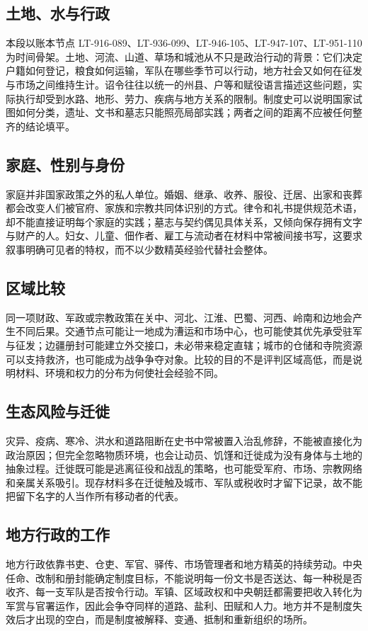 \subsection{土地、水与行政}
本段以账本节点 LT-916-089、LT-936-099、LT-946-105、LT-947-107、LT-951-110 为时间骨架。土地、河流、山道、草场和城池从不只是政治行动的背景：它们决定户籍如何登记，粮食如何运输，军队在哪些季节可以行动，地方社会又如何在征发与市场之间维持生计。诏令往往以统一的州县、户等和赋役语言描述这些问题，实际执行却受到水路、地形、劳力、疾病与地方关系的限制。制度史可以说明国家试图如何分类，遗址、文书和墓志只能照亮局部实践；两者之间的距离不应被任何整齐的结论填平。

\subsection{家庭、性别与身份}
家庭并非国家政策之外的私人单位。婚姻、继承、收养、服役、迁居、出家和丧葬都会改变人们被官府、家族和宗教共同体识别的方式。律令和礼书提供规范术语，却不能直接证明每个家庭的实践；墓志与契约偶见具体关系，又倾向保存拥有文字与财产的人。妇女、儿童、佃作者、雇工与流动者在材料中常被间接书写，这要求叙事明确可见者的特权，而不以少数精英经验代替社会整体。

\subsection{区域比较}
同一项财政、军政或宗教政策在关中、河北、江淮、巴蜀、河西、岭南和边地会产生不同后果。交通节点可能让一地成为漕运和市场中心，也可能使其优先承受驻军与征发；边疆册封可能建立外交接口，未必带来稳定直辖；城市的仓储和寺院资源可以支持救济，也可能成为战争争夺对象。比较的目的不是评判区域高低，而是说明材料、环境和权力的分布为何使社会经验不同。

\subsection{生态风险与迁徙}
灾异、疫病、寒冷、洪水和道路阻断在史书中常被置入治乱修辞，不能被直接化为政治原因；但完全忽略物质环境，也会让动员、饥馑和迁徙成为没有身体与土地的抽象过程。迁徙既可能是逃离征役和战乱的策略，也可能受军府、市场、宗教网络和亲属关系吸引。现存材料多在迁徙触及城市、军队或税收时才留下记录，故不能把留下名字的人当作所有移动者的代表。

\subsection{地方行政的工作}
地方行政依靠书吏、仓吏、军官、驿传、市场管理者和地方精英的持续劳动。中央任命、改制和册封能确定制度目标，不能说明每一份文书是否送达、每一种税是否收齐、每一支军队是否按令行动。军镇、区域政权和中央朝廷都需要把收入转化为军赏与官署运作，因此会争夺同样的道路、盐利、田赋和人力。地方并不是制度失效后才出现的空白，而是制度被解释、变通、抵制和重新组织的场所。


